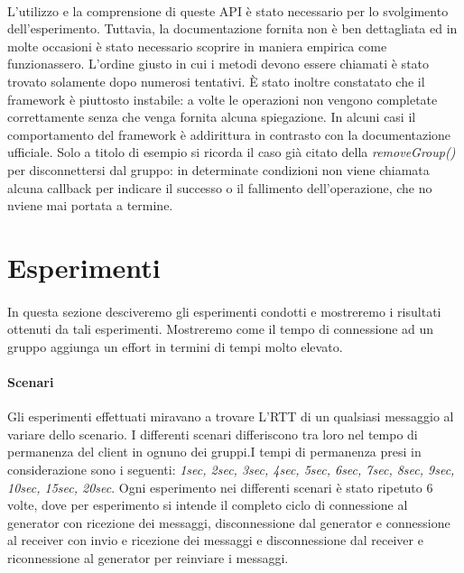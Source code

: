 \documentclass{llncs}
\begin{document}
\paragraph{} L'utilizzo e la comprensione di queste API è stato necessario per lo svolgimento dell'esperimento. Tuttavia, la documentazione fornita non è ben dettagliata ed in molte occasioni è stato necessario scoprire in maniera empirica come funzionassero. L'ordine giusto in cui i metodi devono essere chiamati è stato trovato solamente dopo numerosi tentativi.
È stato inoltre constatato che il framework è piuttosto instabile: a volte le operazioni non vengono completate correttamente senza che venga  fornita alcuna spiegazione. In alcuni casi il comportamento del framework è addirittura in contrasto con la documentazione ufficiale. Solo a titolo di esempio si ricorda il caso già citato della \emph{removeGroup()} per disconnettersi dal gruppo: in determinate condizioni non viene chiamata alcuna callback per indicare il successo o il fallimento dell'operazione, che no nviene mai portata a termine.


\section{Esperimenti}
\paragraph{} In questa sezione desciveremo gli esperimenti condotti e mostreremo i risultati ottenuti da tali esperimenti. Mostreremo come il tempo di connessione ad un gruppo aggiunga un effort in termini di tempi molto elevato.
\paragraph{Scenari} Gli esperimenti effettuati miravano a trovare L'RTT di un qualsiasi messaggio al variare dello scenario. I differenti scenari differiscono tra loro nel tempo di permanenza del client in ognuno dei gruppi.I tempi di permanenza presi in considerazione sono i seguenti: \textit{1sec, 2sec, 3sec, 4sec, 5sec, 6sec, 7sec, 8sec, 9sec, 10sec, 15sec, 20sec}. Ogni esperimento nei differenti scenari è stato ripetuto 6 volte, dove per esperimento si intende il completo ciclo di connessione al generator con ricezione dei messaggi, disconnessione dal generator e connessione al receiver con invio e ricezione dei messaggi e disconnessione dal receiver e riconnessione al generator per reinviare i messaggi.
\end{document}
